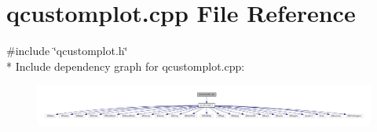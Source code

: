 \section{qcustomplot.\+cpp File Reference}
\label{qcustomplot_8cpp}
{\ttfamily \#include \char`\"{}qcustomplot.\+h\char`\"{}}\\*
Include dependency graph for qcustomplot.\+cpp\+:
\nopagebreak
\begin{figure}[H]
\begin{center}
\leavevmode
\includegraphics[width=350pt]{qcustomplot_8cpp__incl}
\end{center}
\end{figure}
